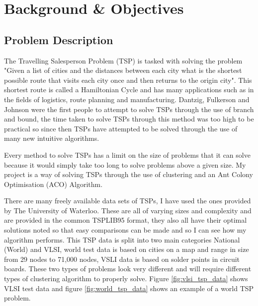 \chapter{Background \& Objectives}

\section{Problem Description}

The Travelling Salesperson Problem (TSP) is tasked with solving the problem "Given a list of cities and the distances between each city what is the shortest possible route that visits each city once and then returns to the origin city". This shortest route is called a Hamiltonian Cycle and has many applications such as in the fields of logistics, route planning and manufacturing\cite{acobook}. Dantzig, Fulkerson and Johnson were the first people to attempt to solve TSPs through the use of branch and bound\cite{dantzig1954solution}, the time taken to solve TSPs through this method was too high to be practical so since then TSPs have attempted to be solved through the use of many new intuitive algorithms.

Every method to solve TSPs has a limit on the size of problems that it can solve because it would simply take too long to solve problems above a given size. My project is a way of solving TSPs through the use of clustering and an Ant Colony Optimisation (ACO) Algorithm.

There are many freely available data sets of TSPs, I have used the ones provided by The University of Waterloo\cite{tsp_test_data_2009}. These are all of varying sizes and complexity and are provided in the common TSPLIB95 format, they also all have their optimal solutions noted so that easy comparisons can be made and so I can see how my algorithm performs. This TSP data is split into two main categories National (World) and VLSI, world test data is based on cities on a map and range in size from 29 nodes to 71,000 nodes, VSLI data is based on solder points in circuit boards. These two types of problems look very different and will require different types of clustering algorithm to properly solve. Figure \ref{fig:vlsi_tsp_data} shows VLSI test data and figure \ref{fig:world_tsp_data} shows an example of a world TSP problem.

